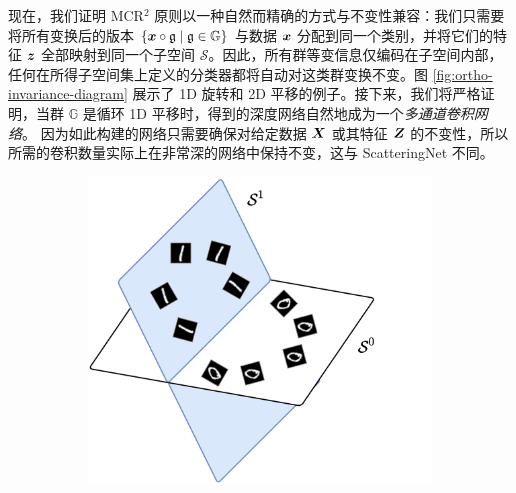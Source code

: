 \documentclass[../../book-main.tex]{subfiles}
\begin{document}
现在，我们证明 MCR$^2$ 原则以一种自然而精确的方式与不变性兼容：我们只需要将所有变换后的版本 $\{\bm{x}\circ \mathfrak{g} \mid \mathfrak{g} \in \mathbb G\}$ 与数据 $\bm{x}$ 分配到同一个类别，并将它们的特征 $\bm{z}$ 全部映射到同一个子空间 $\mathcal S$。因此，所有群等变信息仅编码在子空间内部，任何在所得子空间集上定义的分类器都将自动对这类群变换不变。图 \ref{fig:ortho-invariance-diagram} 展示了 1D 旋转和 2D 平移的例子。接下来，我们将严格证明，当群 $\mathbb G$ 是循环 1D 平移时，得到的深度网络自然地成为一个{\em 多通道卷积网络}。
因为如此构建的网络只需要确保对给定数据 $\bm{X}$ 或其特征 $\bm{Z}$ 的不变性，所以所需的卷积数量实际上在非常深的网络中保持不变，这与 ScatteringNet 不同。

\begin{figure}[t]
    \begin{subfigure}[t]{0.4\textwidth}
        \centering
        \includegraphics[width=\textwidth]{figs_chap4/ortho_diagram_1d.pdf}
    \end{subfigure}
    \hfill
    \begin{subfigure}[t]{0.4\textwidth}
        \centering

\end{subfigure}
\end{figure}
\end{document}
